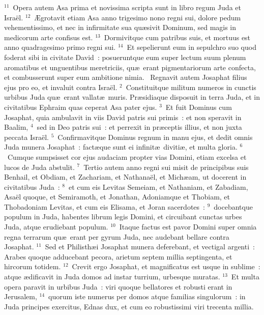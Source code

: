 ${}^{11}$~Opera autem Asa prima et novissima scripta sunt in libro regum Juda et Isra\"el.
${}^{12}$~\AE grotavit etiam Asa anno trigesimo nono regni sui, dolore pedum vehementissimo, et nec in infirmitate sua qu\ae sivit Dominum, sed magis in medicorum arte confisus est.
${}^{13}$~Dormivitque cum patribus suis, et mortuus est anno quadragesimo primo regni sui.
${}^{14}$~Et sepelierunt eum in sepulchro suo quod foderat sibi in civitate David~: posueruntque eum super lectum suum plenum aromatibus et unguentibus meretriciis, qu\ae\ erant pigmentariorum arte confecta, et combusserunt super eum ambitione nimia.
~\lettrine[lines=10,image=true,loversize=0.05,lraise=-0.03]{R}{}egnavit autem Josaphat filius ejus pro eo, et invaluit contra Isra\"el.
${}^{2}$~Constituitque militum numeros in cunctis urbibus Juda qu\ae\ erant vallat\ae\ muris. Pr\ae sidiaque disposuit in terra Juda, et in civitatibus Ephraim quas ceperat Asa pater ejus.
${}^{3}$~Et fuit Dominus cum Josaphat, quia ambulavit in viis David patris sui primis~: et non speravit in Baalim,
${}^{4}$~sed in Deo patris sui~: et perrexit in pr\ae ceptis illius, et non juxta peccata Isra\"el.
${}^{5}$~Confirmavitque Dominus regnum in manu ejus, et dedit omnis Juda munera Josaphat~: fact\ae que sunt ei infinit\ae\ diviti\ae , et multa gloria.
${}^{6}$~Cumque sumpsisset cor ejus audaciam propter vias Domini, etiam excelsa et lucos de Juda abstulit.
${}^{7}$~Tertio autem anno regni sui misit de principibus suis Benhail, et Obdiam, et Zachariam, et Nathana\"el, et Mich\ae am, ut docerent in civitatibus Juda~:
${}^{8}$~et cum eis Levitas Semeiam, et Nathaniam, et Zabadiam, Asa\"el quoque, et Semiramoth, et Jonathan, Adoniamque et Thobiam, et Thobadoniam Levitas, et cum eis Elisama, et Joran sacerdotes~:
${}^{9}$~docebantque populum in Juda, habentes librum legis Domini, et circuibant cunctas urbes Juda, atque erudiebant populum.
${}^{10}$~Itaque factus est pavor Domini super omnia regna terrarum qu\ae\ erant per gyrum Juda, nec audebant bellare contra Josaphat.
${}^{11}$~Sed et Philisth\ae i Josaphat munera deferebant, et vectigal argenti~: Arabes quoque adducebant pecora, arietum septem millia septingenta, et hircorum totidem.
${}^{12}$~Crevit ergo Josaphat, et magnificatus est usque in sublime~: atque \ae dificavit in Juda domos ad instar turrium, urbesque muratas.
${}^{13}$~Et multa opera paravit in urbibus Juda~: viri quoque bellatores et robusti erant in Jerusalem,
${}^{14}$~quorum iste numerus per domos atque familias singulorum~: in Juda principes exercitus, Ednas dux, et cum eo robustissimi viri trecenta millia.
